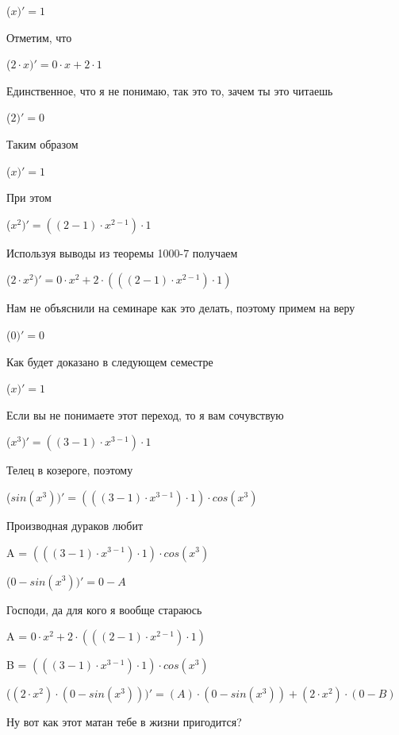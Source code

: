 \documentclass[12pt,a4paper,fleqn]{article}
\begin{document}
\begin{center}
 ($x)'
  = 1$\end{center}
Отметим, что

\begin{center}
 ($2 \cdot x)'
  = 0 \cdot x+2 \cdot 1$\end{center}
Единственное, что я не понимаю, так это то, зачем ты это читаешь

\begin{center}
 ($2)'
  = 0$\end{center}
Таким образом

\begin{center}
 ($x)'
  = 1$\end{center}
При этом

\begin{center}
 ($x^{2})'
  = ((2-1) \cdot x^{2-1}) \cdot 1$\end{center}
Используя выводы из теоремы 1000-7 получаем

\begin{center}
 ($2 \cdot x^{2})'
  = 0 \cdot x^{2}+2 \cdot (((2-1) \cdot x^{2-1}) \cdot 1)$\end{center}
Нам не объяснили на семинаре как это делать, поэтому примем на веру

\begin{center}
 ($0)'
  = 0$\end{center}
Как будет доказано в следующем семестре

\begin{center}
 ($x)'
  = 1$\end{center}
Если вы не понимаете этот переход, то я вам сочувствую

\begin{center}
 ($x^{3})'
  = ((3-1) \cdot x^{3-1}) \cdot 1$\end{center}
Телец в козероге, поэтому

\begin{center}
 ($sin(x^{3}))'
  = (((3-1) \cdot x^{3-1}) \cdot 1) \cdot cos(x^{3})$\end{center}
Производная дураков любит\cite{link2}

\begin{center}
A = $(((3-1) \cdot x^{3-1}) \cdot 1) \cdot cos(x^{3})$\end{center}
\begin{center}
 ($0-sin(x^{3}))'
  = 0-A$\end{center}
Господи, да для кого я вообще стараюсь

\begin{center}
A = $0 \cdot x^{2}+2 \cdot (((2-1) \cdot x^{2-1}) \cdot 1)$\end{center}
\begin{center}
B = $(((3-1) \cdot x^{3-1}) \cdot 1) \cdot cos(x^{3})$\end{center}
\begin{center}
 ($(2 \cdot x^{2}) \cdot (0-sin(x^{3})))'
  = (A) \cdot (0-sin(x^{3}))+(2 \cdot x^{2}) \cdot (0-B)$\end{center}
Ну вот как этот матан тебе в жизни пригодится?
\end{document}
